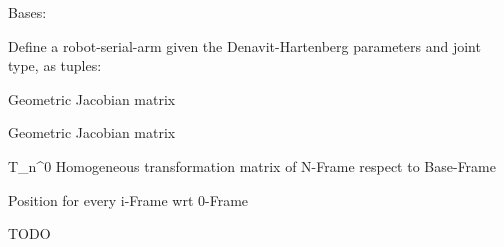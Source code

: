 \documentclass[letterpaper,10pt,english]{sphinxmanual}
\begin{document}

\begin{fulllineitems}
\label{\detokenize{_src/didactic:rkd.didactic.core.Robot}}
Bases: 

Define a robot-serial-arm given the Denavit-Hartenberg parameters 
and joint type, as tuples:

\begin{fulllineitems}
\label{\detokenize{_src/didactic:rkd.didactic.core.Robot.J}}
Geometric Jacobian matrix

\end{fulllineitems}


\begin{fulllineitems}
\label{\detokenize{_src/didactic:rkd.didactic.core.Robot.J_i}}
Geometric Jacobian matrix

\end{fulllineitems}


\begin{fulllineitems}
\label{\detokenize{_src/didactic:rkd.didactic.core.Robot.T}}
T\_n\textasciicircum{}0 
Homogeneous transformation matrix of N-Frame respect to Base-Frame

\end{fulllineitems}


\begin{fulllineitems}
\label{\detokenize{_src/didactic:rkd.didactic.core.Robot.p}}
Position for every i-Frame wrt 0-Frame

\end{fulllineitems}


\begin{fulllineitems}
\label{\detokenize{_src/didactic:rkd.didactic.core.Robot.plot_workspace}}
TODO


\end{fulllineitems}
\end{fulllineitems}
\end{document}
